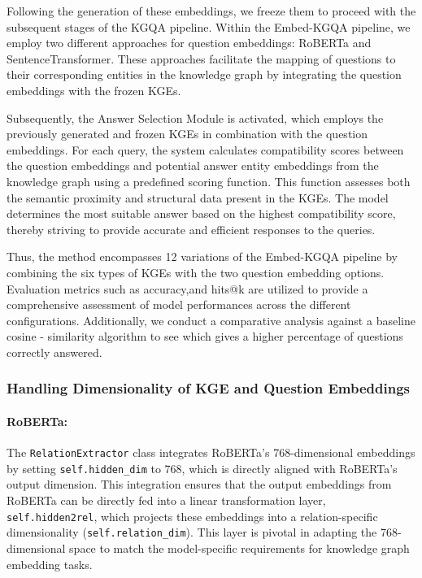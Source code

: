 \documentclass{article}
\begin{document}
Following the generation of these embeddings, we freeze them to proceed with the subsequent stages of the KGQA pipeline. Within the Embed-KGQA pipeline, we employ two different approaches for question embeddings: RoBERTa and SentenceTransformer. These approaches facilitate the mapping of questions to their corresponding entities in the knowledge graph by integrating the question embeddings with the frozen KGEs.

Subsequently, the Answer Selection Module is activated, which employs the previously generated and frozen KGEs in combination with the question embeddings. For each query, the system calculates compatibility scores between the question embeddings and potential answer entity embeddings from the knowledge graph using a predefined scoring function. This function assesses both the semantic proximity and structural data present in the KGEs. The model determines the most suitable answer based on the highest compatibility score, thereby striving to provide accurate and efficient responses to the queries.

Thus, the method encompasses 12 variations of the Embed-KGQA pipeline by combining the six types of KGEs with the two question embedding options. Evaluation metrics such as accuracy,and hits@k are utilized to provide a comprehensive assessment of model performances across the different configurations. Additionally, we conduct a comparative analysis against a baseline cosine - similarity algorithm to see which gives a higher percentage of questions correctly answered.

\subsubsection{Handling Dimensionality of KGE and Question Embeddings}
\paragraph{\textbf{RoBERTa:}} The \texttt{RelationExtractor} class integrates RoBERTa's 768-dimensional embeddings by setting \texttt{self.hidden\_dim} to 768, which is directly aligned with RoBERTa's output dimension. This integration ensures that the output embeddings from RoBERTa can be directly fed into a linear transformation layer, \texttt{self.hidden2rel}, which projects these embeddings into a relation-specific dimensionality (\texttt{self.relation\_dim}). This layer is pivotal in adapting the 768-dimensional space to match the model-specific requirements for knowledge graph embedding tasks.
\end{document}
